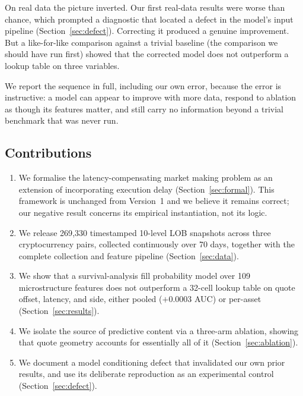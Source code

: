 \documentclass[11pt]{article}
\begin{document}
On real data the picture inverted. Our first real-data results were worse than
chance, which prompted a diagnostic that located a defect in the model's input
pipeline (Section~\ref{sec:defect}). Correcting it produced a genuine
improvement. But a like-for-like comparison against a trivial baseline (the comparison we
should have run first) showed that the corrected model does not outperform a
lookup table on three variables.

We report the sequence in full, including our own error, because the error is
instructive: a model can appear to improve with more data, respond to ablation
as though its features matter, and still carry no information beyond a trivial
benchmark that was never run.

\subsection{Contributions}

\begin{enumerate}[itemsep=2pt,topsep=4pt]
\item We formalise the latency-compensating market making problem as an
extension of \citet{avellaneda2008} incorporating execution delay
(Section~\ref{sec:formal}). This framework is unchanged from Version~1 and we
believe it remains correct; our negative result concerns its empirical
instantiation, not its logic.

\item We release 269{,}330 timestamped 10-level LOB snapshots across three
cryptocurrency pairs, collected continuously over 70 days, together with the
complete collection and feature pipeline (Section~\ref{sec:data}).

\item We show that a survival-analysis fill probability model over 109
microstructure features does not outperform a 32-cell lookup table on quote
offset, latency, and side, either pooled ($+0.0003$ AUC) or per-asset
(Section~\ref{sec:results}).

\item We isolate the source of predictive content via a three-arm ablation,
showing that quote geometry accounts for essentially all of it
(Section~\ref{sec:ablation}).

\item We document a model conditioning defect that invalidated our own prior
results, and use its deliberate reproduction as an experimental control
(Section~\ref{sec:defect}).
\end{enumerate}
\end{document}
